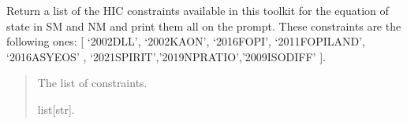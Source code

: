 \documentclass[letterpaper,10pt,english]{sphinxmanual}
\begin{document}
\begin{fulllineitems}
\label{\detokenize{source/api/setup_matter_hic:nucleardatapy.matter.setup_hic.hic_constraints}}
\pysigstartsignatures
{}
\pysigstopsignatures
\sphinxAtStartPar
Return a list of the HIC constraints available in this toolkit
for the equation of state in SM and NM and print them all on
the prompt. These constraints are the following
ones: {[} ‘2002\sphinxhyphen{}DLL’, ‘2002\sphinxhyphen{}KAON’, ‘2016\sphinxhyphen{}FOPI’, ‘2011\sphinxhyphen{}FOPI\sphinxhyphen{}LAND’, ‘2016\sphinxhyphen{}ASY\sphinxhyphen{}EOS’
, ‘2021\sphinxhyphen{}SPIRIT’,’2019\sphinxhyphen{}NP\sphinxhyphen{}RATIO’,’2009\sphinxhyphen{}ISO\sphinxhyphen{}DIFF’ {]}.
\begin{quote}\begin{description}
\sphinxAtStartPar
The list of constraints.

\sphinxAtStartPar
list{[}str{]}.

\end{description}\end{quote}

\end{fulllineitems}

\end{document}
